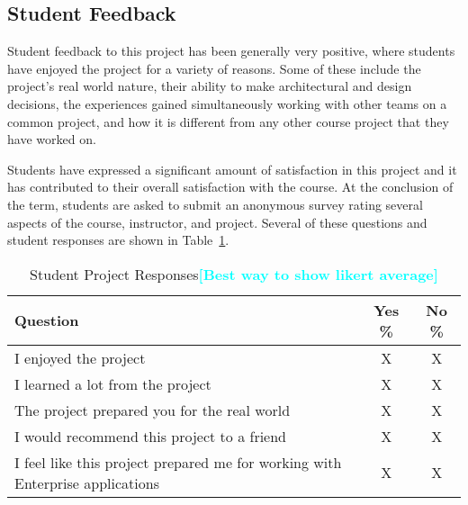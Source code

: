 \documentclass{sig-alternate-05-2015}
\newcommand{\todo}[1]{\textcolor{cyan}{\textbf{[#1]}}}
\begin{document}
%	


\subsection{Student Feedback}

Student feedback to this project has been generally very positive, where students have enjoyed the project for a variety of reasons. Some of these include the project's real world nature, their ability to make architectural and design decisions, the experiences gained simultaneously working with other teams on a common project, and how it is different from any other course project that they have worked on.

Students have expressed a significant amount of satisfaction in this project and it has contributed to their overall satisfaction with the course.  At the conclusion of the term, students are asked to submit an anonymous survey rating several aspects of the course, instructor, and project. Several of these questions and student responses are shown in Table~\ref{Table:studentResponses}.




\begin{table}[ht]
\begin{center}
\caption{Student Project Responses\todo{Best way to show likert average}}
\label{Table:studentResponses}
 \begin{tabular}{ | l | c | c |} \hline

	 \bfseries Question & \bfseries   Yes \% & \bfseries No \% \\ \hline
	


	I enjoyed the project & X & X \\ \hline
	I learned a lot from the project & X & X \\ \hline
	The project prepared you for the real world & X & X \\ \hline
	I would recommend this project to a friend & X & X \\ \hline
	I feel like this project prepared me for working with Enterprise applications & X & X \\ \hline
	
        	 	
  \end{tabular}
\end{center}
\end{table}
\end{document}
